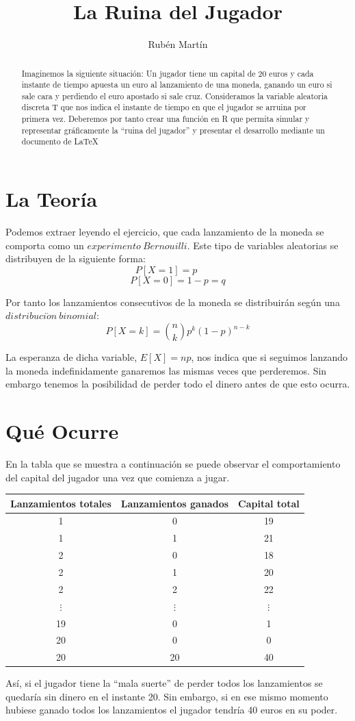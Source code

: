 \documentclass[10pt,a4paper]{article}
\author{Rubén Martín}
\title{La Ruina del Jugador}
\date{}
\begin{document}
\maketitle


\begin{abstract}Imaginemos la siguiente situación: Un jugador tiene un capital de 20 euros y cada instante de tiempo apuesta un euro al lanzamiento de una moneda, ganando un euro si sale cara y perdiendo el euro apostado si sale cruz. Consideramos la variable aleatoria discreta T que nos indica el instante de tiempo en que el jugador se arruina por primera vez. Deberemos por tanto crear una función en R que permita simular y representar gráficamente la ``ruina del jugador'' y presentar el desarrollo mediante un documento de LaTeX\cite{LaTeX}
\end{abstract}


\tableofcontents

\newpage
\section{La Teoría}
Podemos extraer leyendo el ejercicio, que cada lanzamiento de la moneda se comporta como un $experimento\ Bernouilli$. Este tipo de variables aleatorias\cite{prob} se distribuyen de la siguiente forma:
$$P[X=1]=p\ \ \ \ \ \ \ \ \ \ \ $$
$$P[X=0]=1-p=q$$

Por tanto los lanzamientos consecutivos de la moneda se distribuirán según una $distribuci\acute{o}n\ binomial$:
$$P[X=k]=\binom{n}{k} p^k(1-p)^{n-k}$$

La esperanza de dicha variable, $E[X]=np$, nos indica que si seguimos lanzando la moneda indefinidamente ganaremos  las mismas veces que perderemos. Sin embargo tenemos la posibilidad de perder todo el dinero antes de que esto ocurra.

\section{Qué Ocurre}
En la tabla que se muestra a continuación se puede observar el comportamiento del capital del jugador una vez que comienza a jugar.

\begin{center}
\begin{tabular}[t]{c c c}
Lanzamientos totales & Lanzamientos ganados & Capital total\\
\hline
1 & 0 & 19\\
1 & 1 & 21\\
2 & 0 & 18\\
2 & 1 & 20\\
2 & 2 & 22\\
$\vdots$ & $\vdots$ & $\vdots$\\
19 & 0 & 1\\
20 & 0 & 0\\
20 & 20 & 40\\
\end{tabular}
\end{center}
Así, si el jugador tiene la ``mala suerte'' de perder todos los lanzamientos se quedaría sin dinero en el instante 20. Sin embargo, si en ese mismo momento hubiese ganado todos los lanzamientos el jugador tendría 40 euros en su poder.
\newpage
\end{document}
